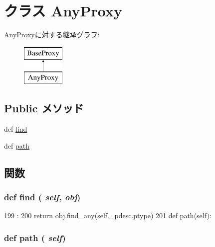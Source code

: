 \hypertarget{classm5_1_1proxy_1_1AnyProxy}{
\section{クラス AnyProxy}
\label{classm5_1_1proxy_1_1AnyProxy}
}
AnyProxyに対する継承グラフ:\begin{figure}[H]
\begin{center}
\leavevmode
\includegraphics[height=2cm]{classm5_1_1proxy_1_1AnyProxy}
\end{center}
\end{figure}
\subsection*{Public メソッド}
\begin{DoxyCompactItemize}
\item 
def \hyperlink{classm5_1_1proxy_1_1AnyProxy_a01f90f57b7acd55e177611f5d0f7df23}{find}
\item 
def \hyperlink{classm5_1_1proxy_1_1AnyProxy_a4767b0796ffc0da267b28b3f24776d97}{path}
\end{DoxyCompactItemize}


\subsection{関数}
\hypertarget{classm5_1_1proxy_1_1AnyProxy_a01f90f57b7acd55e177611f5d0f7df23}{
\subsubsection[{find}]{\setlength{\rightskip}{0pt plus 5cm}def find ( {\em self}, \/   {\em obj})}}
\label{classm5_1_1proxy_1_1AnyProxy_a01f90f57b7acd55e177611f5d0f7df23}



\begin{DoxyCode}
199                        :
200         return obj.find_any(self._pdesc.ptype)
201 
    def path(self):
\end{DoxyCode}
\hypertarget{classm5_1_1proxy_1_1AnyProxy_a4767b0796ffc0da267b28b3f24776d97}{
\subsubsection[{path}]{\setlength{\rightskip}{0pt plus 5cm}def path ( {\em self})}}
\label{classm5_1_1proxy_1_1AnyProxy_a4767b0796ffc0da267b28b3f24776d97}



